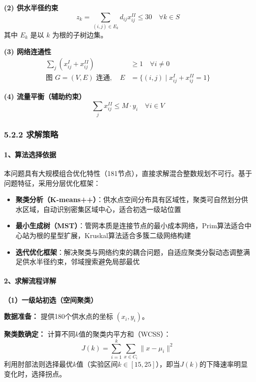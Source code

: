 \documentclass[12pt,a4paper]{article}
\begin{document}
\vspace{0.5em}
\textbf{(2) 供水半径约束}
\[
z_k = \sum_{(i,j) \in E_k} d_{ij} x_{ij}^{II} \leq 30 \quad \forall k \in S
\]
\indent\indent 其中 $E_k$ 是以 $k$ 为根的子树边集。


\vspace{0.5em}
\textbf{(3) 网络连通性}
\begin{align*}
\sum_{j} (x_{ij}^I + x_{ij}^{II}) &\geq 1 \quad \forall i \neq 0 \\
\text{图 } G=(V,E) \text{ 连通}, \quad E &= \{(i,j) \mid x_{ij}^I + x_{ij}^{II} = 1\}
\end{align*}

\vspace{0.5em}
\textbf{(4) 流量平衡（辅助约束）}
\[
\sum_j x_{ij}^{II} \leq M \cdot y_i \quad \forall i \in V
\]


\subsubsection*{5.2.2 求解策略}
\paragraph{1、算法选择依据}
本问题具有大规模组合优化特性（181节点），直接求解混合整数规划不可行。基于问题特征，采用分层优化框架：
\begin{itemize}
  \item \textbf{聚类分析（K-means++）}：供水点空间分布具有区域性，聚类可自然划分供水区域，自动识别密集区域中心，适合初选一级站位置
  \item \textbf{最小生成树（MST）}：管网本质是连接节点的最小成本网络，Prim算法适合中心站为根的星型扩展，Kruskal算法适合多簇二级网络构建
  \item \textbf{迭代优化框架}：解决聚类与网络约束的耦合问题，自适应聚类分裂动态调整满足供水半径约束，邻域搜索避免局部最优
\end{itemize}

\paragraph{2、求解流程详解}

\vspace{1em}
\textbf{（1）一级站初选（空间聚类）}

\vspace{0.7em}
\textbf{数据准备：} 提供180个供水点的坐标 $(x_i, y_i)$。

\vspace{0.7em}
\textbf{聚类数确定：} 计算不同$k$值的聚类内平方和（WCSS）：
\[
  J(k) = \sum_{i=1}^k \sum_{x \in C_i} \|x - \mu_i\|^2
\]
利用肘部法则选择最优$k$值（实验区间$k \in [15,25]$），即当$J(k)$的下降速率明显变化时，选择拐点。
\end{document}
